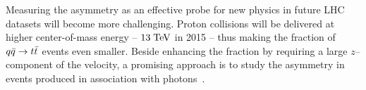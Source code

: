 Measuring the asymmetry \ac{} as an effective probe for new physics in
future LHC datasets will become more challenging. Proton collisions
will be delivered at higher center-of-mass energy -- $13\; \mathrm{TeV}{}$ in
2015 -- thus making the fraction of $q\bar{q}{}\to t\bar{t}{}$ events even
smaller. Beside enhancing the \qqbar{} fraction by requiring a large
$z$--component of the \ttbar{} velocity, a promising approach is to
study the asymmetry in \ttbar{} events produced in association with
photons~\cite{Aguilar-Saavedra:2014vta}. 
